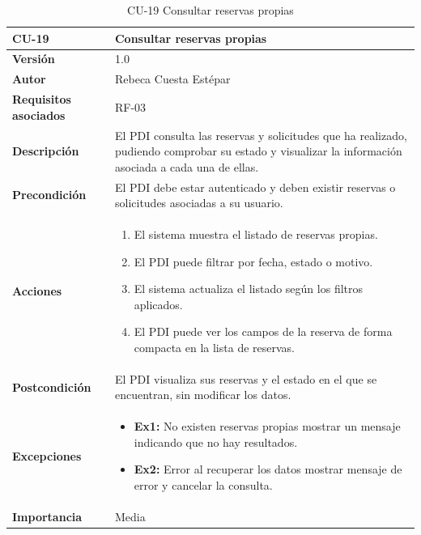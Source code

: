 \begin{table}[p]
	\centering
	\begin{tabularx}{\linewidth}{ p{} p{} }
		\toprule
		\textbf{CU-19} & \textbf{Consultar reservas propias}\\
		\toprule
		\textbf{Versión} & 1.0 \\
		\textbf{Autor} & Rebeca Cuesta Estépar \\
		\textbf{Requisitos asociados} & RF-03 \\
		\textbf{Descripción} & El PDI consulta las reservas y solicitudes que ha realizado, pudiendo comprobar su estado y visualizar la información asociada a cada una de ellas. \\
		\textbf{Precondición} & El PDI debe estar autenticado y deben existir reservas o solicitudes asociadas a su usuario. \\
		\textbf{Acciones} &
		\begin{enumerate}
			\def\labelenumi{\arabic{enumi}.}
			\tightlist
			\item El sistema muestra el listado de reservas propias.
			\item El PDI puede filtrar por fecha, estado o motivo.
			\item El sistema actualiza el listado según los filtros aplicados.
			\item El PDI puede ver los campos de la reserva de forma compacta en la lista de reservas.
		\end{enumerate}\\
		\textbf{Postcondición} & El PDI visualiza sus reservas y el estado en el que se encuentran, sin modificar los datos. \\
		\textbf{Excepciones} &
		\begin{itemize}
			\tightlist
			\item \textbf{Ex1:} No existen reservas propias \textrightarrow{} mostrar un mensaje indicando que no hay resultados.
			\item \textbf{Ex2:} Error al recuperar los datos \textrightarrow{} mostrar mensaje de error y cancelar la consulta.
		\end{itemize}\\
		\textbf{Importancia} & Media \\
		\bottomrule
	\end{tabularx}
	\caption{CU-19 Consultar reservas propias}
\end{table}

